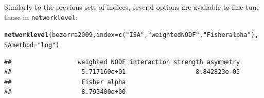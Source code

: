 \documentclass[a4paper, 11pt]{article}\usepackage[]{graphicx}\usepackage[]{color}
\makeatletter
\newcommand{\hlstr}[1]{\textcolor[rgb]{0.192,0.494,0.8}{#1}}%
\newcommand{\hlstd}[1]{\textcolor[rgb]{0.345,0.345,0.345}{#1}}%
\newcommand{\hlkwc}[1]{\textcolor[rgb]{0.333,0.667,0.333}{#1}}%
\newcommand{\hlkwd}[1]{\textcolor[rgb]{0.737,0.353,0.396}{\textbf{#1}}}%
\newenvironment{kframe}{%
 \def\at@end@of@kframe{}%
 \ifinner\ifhmode%
  \def\at@end@of@kframe{\end{minipage}}%
  \begin{minipage}{\columnwidth}%
 \fi\fi%
 \def\FrameCommand##1{\hskip\@totalleftmargin \hskip-\fboxsep
 \colorbox{shadecolor}{##1}\hskip-\fboxsep
     \hskip-\linewidth \hskip-\@totalleftmargin \hskip\columnwidth}%
 \MakeFramed {\advance\hsize-\width
   \@totalleftmargin\z@ \linewidth\hsize
   \@setminipage}}%
 {\par\unskip\endMakeFramed%
 \at@end@of@kframe}
\newenvironment{knitrout}{}{} %
\makeatother
\begin{document}
\noindent Similarly to the previous sets of indices, several options are available to fine-tune those in \texttt{networklevel}:
\begin{knitrout}
\color{fgcolor}\begin{kframe}
\begin{alltt}
\hlkwd{networklevel}\hlstd{(bezerra2009,} \hlkwc{index}\hlstd{=}\hlkwd{c}\hlstd{(}\hlstr{"ISA"}\hlstd{,} \hlstr{"weighted NODF"}\hlstd{,} \hlstr{"Fisher alpha"}\hlstd{),}
             \hlkwc{SAmethod}\hlstd{=}\hlstr{"log"}\hlstd{)}
\end{alltt}
\begin{verbatim}
##                  weighted NODF interaction strength asymmetry 
##                   5.717160e+01                   8.842823e-05 
##                   Fisher alpha 
##                   8.793400e+00
\end{verbatim}
\end{kframe}
\end{knitrout}
\end{document}
